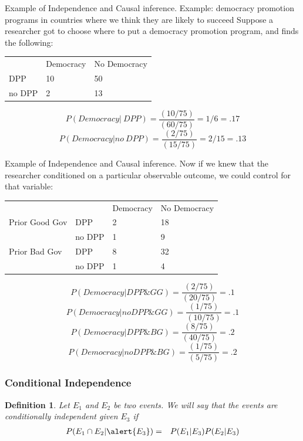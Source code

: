 \documentclass[handout]{beamer}
\newtheorem{defn}{Definition}
\numberwithin{equation}{section}
\begin{document}
\begin{frame}{Example of Independence and Causal inference.}
Example: democracy promotion programs in countries where we think they are likely to succeed\pause
Suppose a researcher got to choose where to put a democracy promotion program, and finds the following:
\begin{table}
\begin{tabular}{lll}
		&Democracy& No Democracy\\
DPP &10 & 50\\
no DPP & 2& 13\\

\end{tabular}
\end{table}
\pause
$$P(Democracy|\ DPP)= \frac{(10/75)}{(60/75)} =1/6= .17$$
$$P(Democracy| no\ DPP)=  \frac{(2 /75)}{(15/75)} = 2/15=.13$$

 \end{frame}




\begin{frame}{Example of Independence and Causal inference.}
Now if we knew that the researcher conditioned on a particular observable outcome, we could control for that variable:\pause

\begin{table}
\begin{tabular}{llll}
		&&Democracy& No Democracy\\
 Prior Good Gov & DPP &2 & 18\\
		 &no DPP & 1& 9\\
		 \hline
Prior Bad Gov  & DPP &8 & 32\\
		&no DPP & 1& 4\\



\end{tabular}
\end{table}
\pause
$$P(Democracy| DPP\& GG)= \frac{(2/75)}{( 20/75)} = .1$$
$$P(Democracy| no DPP\& GG)=  \frac{(1/75)}{(10/75)} = .1$$
\pause
$$P(Democracy| DPP\& BG)= \frac{(8/75)}{( 40/75)} = .2$$
$$P(Democracy| no DPP\& BG)=  \frac{(1/75)}{(5/75)} = .2$$
 \end{frame}




\begin{frame}
\frametitle{Conditional  Independence}

\begin{defn}
Let $E_{1}$ and $E_{2}$ be two events.  We will say that the events are conditionally independent given $E_{3}$ if 
\begin{eqnarray}
P(E_{1} \cap E_{2} | \alert{E_{3}}) & = & P(E_{1} | E_{3} ) P(E_{2} | E_{3} ) \nonumber 
\end{eqnarray}


\end{defn}



\end{frame}
\end{document}
